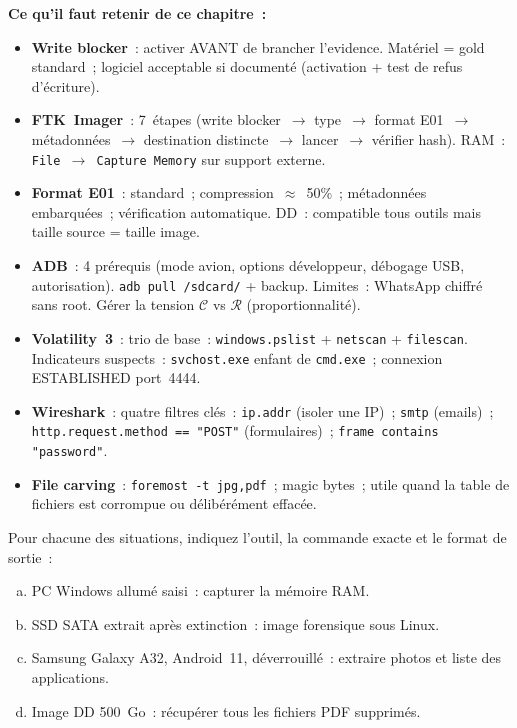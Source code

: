 \begin{boxresume}
\textbf{Ce qu'il faut retenir de ce chapitre~:}
\begin{itemize}
    \item \textbf{Write blocker}~: activer AVANT de brancher l'evidence.
          Matériel = gold standard~; logiciel acceptable si documenté
          (activation + test de refus d'écriture).

    \item \textbf{FTK~Imager}~: 7~étapes (write blocker~$\to$ type~$\to$
          format E01~$\to$ métadonnées~$\to$ destination distincte~$\to$
          lancer~$\to$ vérifier hash). RAM~: \texttt{File~$\to$~Capture
          Memory} sur support externe.

    \item \textbf{Format E01}~: standard~; compression~$\approx$~50\%~;
          métadonnées embarquées~; vérification automatique.
          DD~: compatible tous outils mais taille source = taille image.

    \item \textbf{ADB}~: 4 prérequis (mode avion, options développeur,
          débogage USB, autorisation). \texttt{adb pull /sdcard/} +
          backup. Limites~: WhatsApp chiffré sans root. Gérer
          la tension $\mathcal{C}$ vs $\mathcal{R}$ (proportionnalité).

    \item \textbf{Volatility~3}~: trio de base~: \texttt{windows.pslist}
          + \texttt{netscan} + \texttt{filescan}. Indicateurs suspects~:
          \texttt{svchost.exe} enfant de \texttt{cmd.exe}~; connexion
          ESTABLISHED port~4444.

    \item \textbf{Wireshark}~: quatre filtres clés~: \texttt{ip.addr}
          (isoler une IP)~; \texttt{smtp} (emails)~;
          \texttt{http.request.method == "POST"} (formulaires)~;
          \texttt{frame contains "password"}.

    \item \textbf{File carving}~: \texttt{foremost -t jpg,pdf}~;
          magic bytes~; utile quand la table de fichiers est corrompue
          ou délibérément effacée.
\end{itemize}
\end{boxresume}

\bigskip

\begin{boxexo}[title={\ding{45}\quad Exercice~9.1. Choix d'outil \niveaubase}]
Pour chacune des situations, indiquez l'outil, la commande exacte et
le format de sortie~:
\begin{enumerate}[(a)]
    \item PC Windows allumé saisi~: capturer la mémoire RAM.
    \item SSD SATA extrait après extinction~: image forensique sous Linux.
    \item Samsung Galaxy A32, Android~11, déverrouillé~: extraire photos
          et liste des applications.
    \item Image DD 500~Go~: récupérer tous les fichiers PDF supprimés.
\end{enumerate}
\end{boxexo}

